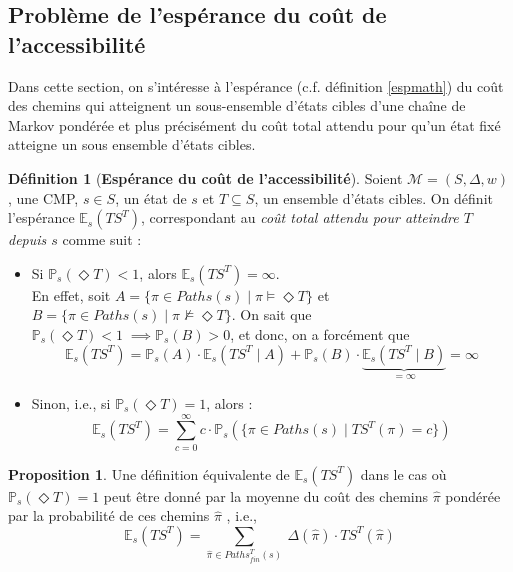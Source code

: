 \documentclass[12pt,a4paper]{report}
\theoremstyle{definition}%
\newtheorem{definition}{Définition}[chapter]
\newtheorem{proposition}{Proposition}[chapter]
\theoremstyle{remark}
\newcommand{\ie}{i.e., }
\newcommand{\cf}{c.f. }
\newcommand{\pr}{\mathbb{P}}
\let\labelitemi\labelitemii
\begin{document}
\subsection{Problème de l'espérance du coût de l'accessibilité}
Dans cette section, on s'intéresse à l'espérance (\cf définition \ref{espmath}) du coût des chemins qui atteignent un sous-ensemble d'états cibles d'une chaîne de Markov pondérée et plus précisément du coût total attendu pour qu'un état fixé atteigne un sous ensemble d'états cibles.

\begin{definition}[\textbf{Espérance du coût de l'accessibilité}]
	Soient $\mathcal{M} = (S, \Delta, w)$, une CMP, $s \in S$, un état de $s$ et $T \subseteq S$, un ensemble d'états cibles. On définit l'espérance $\mathbb{E}_s(TS^T)$, correspondant au \textit{coût total attendu pour atteindre $T$ depuis $s$} comme suit :
	\begin{itemize}
	\renewcommand{\labelitemi}{\tiny$\bullet$}
	\item Si $\pr_s(\Diamond T) < 1$, alors $\mathbb{E}_s(TS^T) = \infty$.%
		\\ En effet, soit $A = \{ \pi \in Paths(s) \; | \; \pi \models \Diamond T  \}$ et $B = \{ \pi \in Paths(s) \; | \; \pi \not \models \Diamond T  \}$. On sait que $\pr_s(\Diamond T) < 1 \; \implies \pr_s(B) > 0$, et donc, on a forcément que
		\[
			\mathbb{E}_s (TS^T) = \pr_s(A) \cdot \mathbb{E}_s(TS^T \; | \; A) + \pr_s(B) \cdot \underbrace{\mathbb{E}_s(TS^T \; | \; B)}_{ = \infty } = \infty
		\]
	\item Sinon, \ie si $\pr_s(\Diamond T) = 1$, alors :
	\[ \mathbb{E}_s(TS^T) = \sum_{c = 0}^\infty c \cdot \pr_s(\{\pi \in Paths(s) \; | \; TS^T(\pi) = c \})\]
	\end{itemize}
\end{definition}

\begin{proposition}
			Une définition équivalente de $\mathbb{E}_s(TS^T)$ dans le cas où $\pr_s(\Diamond T) = 1$ peut être donné par la moyenne du coût des chemins $\hat{\pi}$ pondérée par la probabilité de ces chemins $\hat{\pi}$ %
	, \ie
	\[\mathbb{E}_s(TS^T) = \sum_{\hat{\pi} \in Paths_{fin}^T(s)}\ \Delta(\hat{\pi}) \cdot TS^T(\hat{\pi})\]
\end{proposition}
\end{document}
